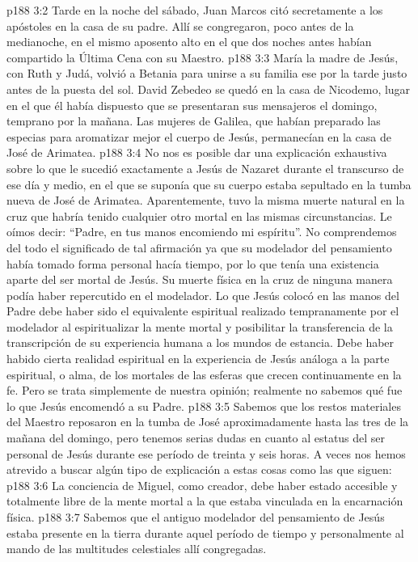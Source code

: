 \vs p188 3:2 Tarde en la noche del sábado, Juan Marcos citó secretamente a los apóstoles en la casa de su padre. Allí se congregaron, poco antes de la medianoche, en el mismo aposento alto en el que dos noches antes habían compartido la Última Cena con su Maestro.
\vs p188 3:3 María la madre de Jesús, con Ruth y Judá, volvió a Betania para unirse a su familia ese  por la tarde justo antes de la puesta del sol. David Zebedeo se quedó en la casa de Nicodemo, lugar en el que él había dispuesto que se presentaran sus mensajeros el domingo, temprano por la mañana. Las mujeres de Galilea, que habían preparado las especias para aromatizar mejor el cuerpo de Jesús, permanecían en la casa de José de Arimatea.
\vs p188 3:4 \pc No nos es posible dar una explicación exhaustiva sobre lo que le sucedió exactamente a Jesús de Nazaret durante el transcurso de ese día y medio, en el que se suponía que su cuerpo estaba sepultado en la tumba nueva de José de Arimatea. Aparentemente, tuvo la misma muerte natural en la cruz que habría tenido cualquier otro mortal en las mismas circunstancias. Le oímos decir: “Padre, en tus manos encomiendo mi espíritu”. No comprendemos del todo el significado de tal afirmación ya que su modelador del pensamiento había tomado forma personal hacía tiempo, por lo que tenía una existencia aparte del ser mortal de Jesús. Su muerte física en la cruz de ninguna manera podía haber repercutido en el modelador. Lo que Jesús colocó en las manos del Padre debe haber sido el equivalente espiritual realizado tempranamente por el modelador al espiritualizar la mente mortal y posibilitar la transferencia de la transcripción de su experiencia humana a los mundos de estancia. Debe haber habido cierta realidad espiritual en la experiencia de Jesús análoga a la parte espiritual, o alma, de los mortales de las esferas que crecen continuamente en la fe. Pero se trata simplemente de nuestra opinión; realmente no sabemos qué fue lo que Jesús encomendó a su Padre.
\vs p188 3:5 Sabemos que los restos materiales del Maestro reposaron en la tumba de José aproximadamente hasta las tres de la mañana del domingo, pero tenemos serias dudas en cuanto al estatus del ser personal de Jesús durante ese período de treinta y seis horas. A veces nos hemos atrevido a buscar algún tipo de explicación a estas cosas como las que siguen:
\vs p188 3:6 La conciencia de Miguel, como creador, debe haber estado accesible y totalmente libre de la mente mortal a la que estaba vinculada en la encarnación física.
\vs p188 3:7 Sabemos que el antiguo modelador del pensamiento de Jesús estaba presente en la tierra durante aquel período de tiempo y personalmente al mando de las multitudes celestiales allí congregadas.
